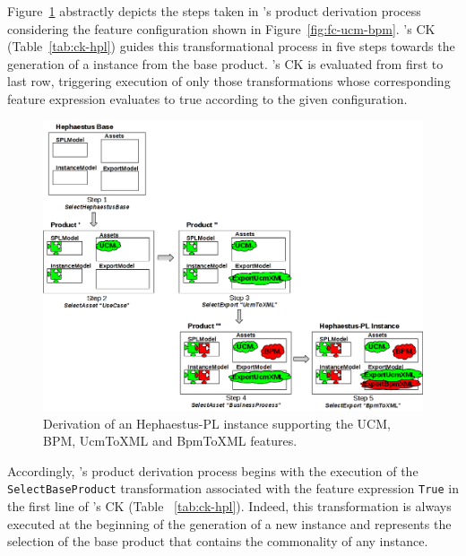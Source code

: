 
Figure~\ref{fig:derivationHPL} abstractly depicts the steps taken in \hpl's product derivation process considering the feature configuration shown in  Figure~\ref{fig:fc-ucm-bpm}. \hpl{}'s CK (Table~\ref{tab:ck-hpl}) guides this transformational process in five steps towards the generation of a \hpl{} instance from the base product. \hpl{}'s CK is evaluated from first to last row, triggering execution of only those transformations whose corresponding feature expression evaluates to true according to the given configuration.


\begin{figure}[bth]
\begin{center}
\includegraphics[width=\textwidth]{imagens/derivation.png}
\end{center}
\caption{Derivation of an Hephaestus-PL instance supporting the UCM, BPM, UcmToXML and BpmToXML features.}
\label{fig:derivationHPL}
\end{figure}


Accordingly, \hpl's product derivation process begins with the execution of the \texttt{SelectBaseProduct} transformation associated with
the feature expression \texttt{True} in the first line of \hpl's CK (Table ~\ref{tab:ck-hpl}). Indeed,
this transformation is always executed at the beginning of the generation of a new \hpl{} instance and represents the selection of the base product that contains the commonality of any \hpl{} instance.

